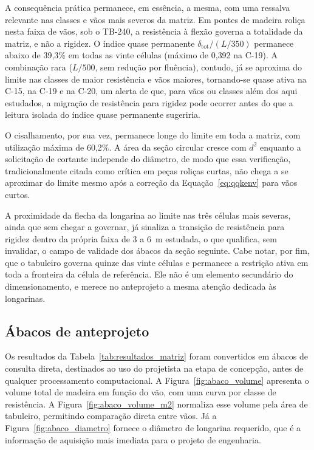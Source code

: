A consequência prática permanece, em essência, a mesma, com uma ressalva relevante nas classes e vãos mais severos da matriz.
Em pontes de madeira roliça nesta faixa de vãos, sob o TB-240, a resistência à flexão governa a totalidade da matriz, e não a rigidez. O índice quase permanente $\delta_{\mathrm{tot}}/(L/350)$ permanece abaixo de 39{,}3\% em todas as vinte células (máximo de 0{,}392 na C-19).
A combinação rara ($L/500$, sem redução por fluência), contudo, já se aproxima do limite nas classes de maior resistência e vãos maiores, tornando-se quase ativa na C-15, na C-19 e na C-20, um alerta de que, para vãos ou classes além dos aqui estudados, a migração de resistência para rigidez pode ocorrer antes do que a leitura isolada do índice quase permanente sugeriria.

O cisalhamento, por sua vez, permanece longe do limite em toda a matriz, com utilização máxima de 60{,}2\%. A área da seção circular cresce com $d^2$ enquanto a solicitação de cortante independe do diâmetro, de modo que essa verificação, tradicionalmente citada como crítica em peças roliças curtas, não chega a se aproximar do limite mesmo após a correção da Equação~\eqref{eq:qqkenv} para vãos curtos.

A proximidade da flecha da longarina ao limite nas três células mais severas, ainda que sem chegar a governar, já sinaliza a transição de resistência para rigidez dentro da própria faixa de 3 a 6~m estudada, o que qualifica, sem invalidar, o campo de validade dos ábacos da seção seguinte.
Cabe notar, por fim, que o tabuleiro governa quinze das vinte células e permanece a restrição ativa em toda a fronteira da célula de referência. Ele não é um elemento secundário do dimensionamento, e merece no anteprojeto a mesma atenção dedicada às longarinas.

\subsection{Ábacos de anteprojeto}\label{sec:abacos}

Os resultados da Tabela~\ref{tab:resultados_matriz} foram convertidos em ábacos de consulta direta, destinados ao uso do projetista na etapa de concepção, antes de qualquer processamento computacional.
A Figura~\ref{fig:abaco_volume} apresenta o volume total de madeira em função do vão, com uma curva por classe de resistência. A Figura~\ref{fig:abaco_volume_m2} normaliza esse volume pela área de tabuleiro, permitindo comparação direta entre vãos. Já a Figura~\ref{fig:abaco_diametro} fornece o diâmetro de longarina requerido, que é a informação de aquisição mais imediata para o projeto de engenharia.


